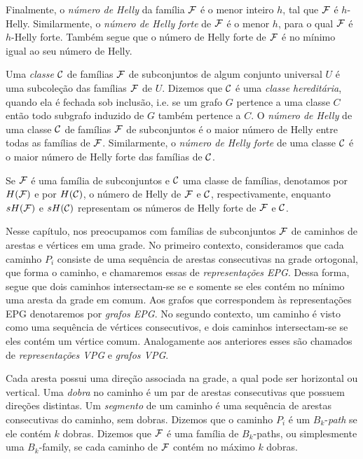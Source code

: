 Finalmente, o   {\it número de Helly} da família  $\cal{F}$ é o menor inteiro $h$, tal que $\cal{F}$ é  $h$-Helly. Similarmente, o {\it número de Helly forte} de  $\cal{F}$ é o menor $h$, para o qual  $\cal{F}$ é  $h$-Helly forte. Também segue que o número de Helly forte de $\cal{F}$ é no mínimo igual ao seu número de Helly.


Uma  {\it classe} $\cal {C}$ de famílias $\cal {F}$  de subconjuntos de algum conjunto universal $U$ é uma  subcoleção das famílias $\cal {F}$ de $U$. Dizemos que  $\cal C$ é uma {\it classe hereditária}, quando ela é fechada sob inclusão, i.e. se um grafo $G$ pertence a uma classe $C$ então todo subgrafo induzido de $G$ também pertence a $C$. O {\it número de Helly}  de uma classe  $\cal{C}$ de famílias $\cal{F}$ de subconjuntos é o maior número de Helly entre todas as famílias de $\cal {F}$. Similarmente, o {\it número de Helly forte} de uma classe  $\cal {C}$ é o maior número de Helly forte das famílias de $\cal {C}$.

Se $\cal F$ é uma família de subconjuntos e $\cal C$ uma classe de famílias, denotamos por $H(\cal F)$ e por 
$H(\cal C)$,  o número de  Helly de $\cal F$ e $\cal C$, respectivamente, enquanto  $sH({\cal F})$ e $sH({\cal C})$  representam os números de  Helly forte de $\cal F$ e $\cal C$.


Nesse capítulo, nos preocupamos com famílias de subconjuntos $\cal{F}$ de caminhos de arestas e vértices em uma grade. No primeiro contexto, consideramos que cada caminho $P_i$  consiste de uma sequência de arestas consecutivas na grade ortogonal, que forma o caminho, e chamaremos essas de   {\it representações EPG}. Dessa forma, segue que dois caminhos intersectam-se se e somente se eles contém no mínimo uma aresta da grade em comum. Aos grafos que  correspondem às representações EPG denotaremos por {\it grafos EPG}. 
No segundo contexto, um caminho é visto como uma sequência de vértices consecutivos, e dois caminhos intersectam-se se eles contém um vértice comum. Analogamente aos anteriores esses são chamados de {\it representações VPG} e {\it grafos VPG}. 

Cada aresta possui uma direção associada na grade, a qual pode ser horizontal ou vertical. Uma  {\it dobra} no caminho é um par de arestas consecutivas que possuem direções distintas.  Um {\it segmento} de um caminho é uma sequência de arestas consecutivas do caminho, sem dobras. Dizemos que o caminho $P_i$ é um  $B_k$-{\it path} se ele contém $k$ dobras. Dizemos que $\cal {F}$ é uma família de $B_k$-paths, ou simplesmente  uma $B_k$-family, se cada caminho de $\cal {F}$ contém no máximo $k$ dobras. 

